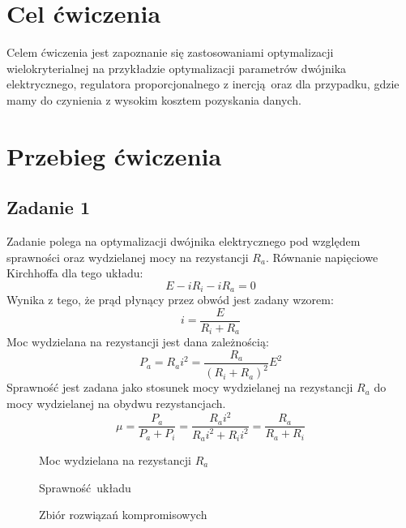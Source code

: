 \documentclass[a4paper, 12pt]{article}
\begin{document}
	\noindent
	\section{Cel ćwiczenia}
        Celem ćwiczenia jest zapoznanie się zastosowaniami optymalizacji wielokryterialnej na
        przykładzie optymalizacji parametrów dwójnika elektrycznego, regulatora proporcjonalnego 
        z inercją oraz dla przypadku, gdzie mamy do czynienia z wysokim kosztem pozyskania danych.
	\section{Przebieg ćwiczenia}
        \subsection{Zadanie 1}
            Zadanie polega na optymalizacji dwójnika elektrycznego pod względem sprawności oraz 
            wydzielanej mocy na rezystancji $R_a$. Równanie napięciowe Kirchhoffa dla tego układu:
            $$
                E - iR_i - iR_a = 0
            $$
            Wynika z tego, że prąd płynący przez obwód jest zadany wzorem:
            $$
                i = \frac{E}{R_i + R_a}
            $$
            Moc wydzielana na rezystancji jest dana zależnością:
            $$
                P_a = R_a i^2 = \frac{R_a}{(R_i + R_a)^2} E ^ 2
            $$
            Sprawność jest zadana jako stosunek mocy wydzielanej na rezystancji $R_a$ do mocy
            wydzielanej na obydwu rezystancjach.
            $$
                \mu = \frac{P_a}{P_a + P_i} = \frac{R_ai^2}{R_ai^2 + R_ii^2} = \frac{R_a}{R_a + R_i}
            $$
            \begin{figure}[H]
                \centering
                \def \svgwidth{0.7\columnwidth}
                
                \caption{Moc wydzielana na rezystancji $R_a$}
            \end{figure}\noindent
            
            \begin{figure}[H]
                \centering
                \def \svgwidth{0.7\columnwidth}
                
                \caption{Sprawność układu}
            \end{figure}\noindent
            \begin{figure}[H]
                \centering
                \def \svgwidth{0.7\columnwidth}
                
                \caption{Zbiór rozwiązań kompromisowych}
            \end{figure}\noindent
\end{document}

